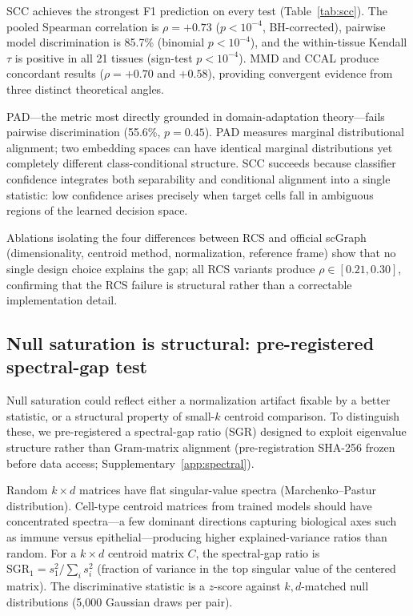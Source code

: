 \documentclass[11pt]{article}
\begin{document}
SCC achieves the strongest F1 prediction on every test
(Table~\ref{tab:scc}). The pooled Spearman correlation is $\rho = +0.73$
($p < 10^{-4}$, BH-corrected), pairwise model discrimination is 85.7\%
(binomial $p < 10^{-4}$), and the within-tissue Kendall $\tau$ is
positive in all 21 tissues (sign-test $p < 10^{-4}$). MMD and CCAL
produce concordant results ($\rho = +0.70$ and $+0.58$), providing
convergent evidence from three distinct theoretical angles.

PAD---the metric most directly grounded in domain-adaptation
theory---fails pairwise discrimination (55.6\%, $p = 0.45$). PAD
measures marginal distributional alignment; two embedding spaces can have
identical marginal distributions yet completely different class-conditional
structure. SCC succeeds because classifier confidence integrates both
separability and conditional alignment into a single statistic: low
confidence arises precisely when target cells fall in ambiguous regions
of the learned decision space.

Ablations isolating the four differences between RCS and official scGraph
(dimensionality, centroid method, normalization, reference frame) show
that no single design choice explains the gap; all RCS variants
produce $\rho \in [0.21, 0.30]$, confirming that the RCS failure is
structural rather than a correctable implementation detail.


\subsection{Null saturation is structural: pre-registered spectral-gap test}
\label{sec:spectral}

Null saturation could reflect either a normalization artifact fixable by
a better statistic, or a structural property of small-$k$ centroid
comparison. To distinguish these, we pre-registered a spectral-gap
ratio (SGR) designed to exploit eigenvalue structure rather than
Gram-matrix alignment (pre-registration SHA-256 frozen before data
access; Supplementary~\ref{app:spectral}).

Random $k \times d$ matrices have flat singular-value spectra
(Marchenko--Pastur distribution). Cell-type centroid matrices from
trained models should have concentrated spectra---a few dominant
directions capturing biological axes such as immune versus
epithelial---producing higher explained-variance ratios than random.
For a $k \times d$ centroid matrix $C$, the spectral-gap ratio is
$\mathrm{SGR}_1 = s_1^2 / \sum_i s_i^2$ (fraction of variance in the
top singular value of the centered matrix). The discriminative
statistic is a $z$-score against $k,d$-matched null distributions
(5,000 Gaussian draws per pair).
\end{document}
